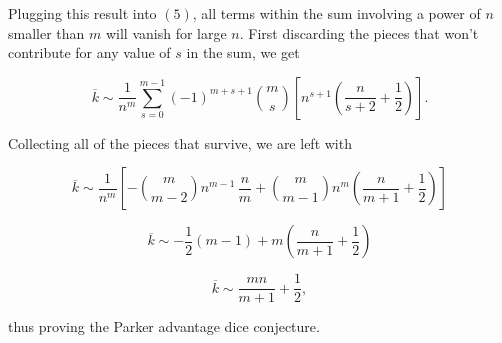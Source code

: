 \documentclass[12pt]{article}
\begin{document}
Plugging this result into $(5)$, all terms within the sum involving a power of $n$ smaller than $m$ will vanish for large $n$. First discarding the pieces that won't contribute for any value of $s$ in the sum, we get

\begin{equation}
    \overline{k}
    \sim \frac{1}{n^m} \sum_{s=0}^{m-1} {\left(-1\right)}^{m+s+1} \binom{m}{s} \left[n^{s+1} \left(\frac{n}{s+2} + \frac{1}{2}\right) \right].
\end{equation}

Collecting all of the pieces that survive, we are left with

\begin{equation}
    \overline{k}
    \sim \frac{1}{n^m} \left[-\binom{m}{m-2} n^{m-1} \, \frac{n}{m} + \binom{m}{m-1} n^m \left(\frac{n}{m+1} + \frac{1}{2}\right)\right]
\end{equation}

\begin{equation}
    \overline{k}
    \sim -\frac{1}{2} \left(m-1\right) + m \left(\frac{n}{m+1} + \frac{1}{2}\right)
\end{equation}

\begin{equation}
    \overline{k}
    \sim \frac{mn}{m+1} + \frac{1}{2},
\end{equation}

thus proving the Parker advantage dice conjecture.
\end{document}
